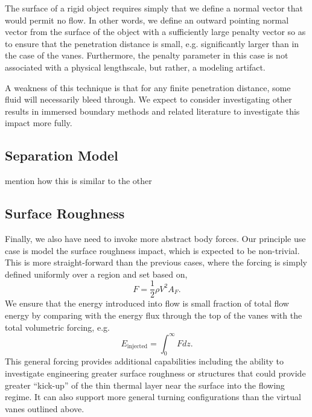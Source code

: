 The surface of a rigid object requires simply that we
define a normal vector that would permit no flow. In other words, we
define an outward pointing normal vector from the surface of the object
with a sufficiently large penalty vector so as to ensure that the
penetration distance is small, e.g. significantly larger than in the
case of the vanes. Furthermore, the penalty parameter in this case is
not associated with a physical lengthscale, but rather, a modeling
artifact. 


A weakness of this technique is that for
any finite penetration distance, some fluid will necessarily bleed
through. We expect to consider investigating other results in 
immersed boundary methods and related literature to investigate this
impact more fully. 


\subsection{Separation Model}

mention how this is similar to the other

\subsection{Surface Roughness}

Finally, we also have need to invoke more abstract body forces. 
Our principle use case is model the surface roughness
impact, which is expected to be non-trivial\cite{oke1987boundary}. This
is more straight-forward than the previous cases, where the forcing is
simply defined uniformly over a region and set based on, 
\begin{equation}
 F = \frac{1}{2}\rho V^2 A_F. 
\end{equation}
We ensure that the energy introduced into flow is small fraction of
total flow energy by comparing with the energy flux through the top of
the vanes with the total volumetric forcing, e.g. 
\begin{equation}
 E_{\text{injected}} = \int_0^\infty F dz. 
\end{equation}
This general forcing provides additional capabilities including the
ability to investigate engineering greater surface roughness or
structures that could provide greater ``kick-up'' of the thin thermal
layer near the surface into the flowing regime. It can also support more
general turning configurations than the virtual vanes outlined above. 
